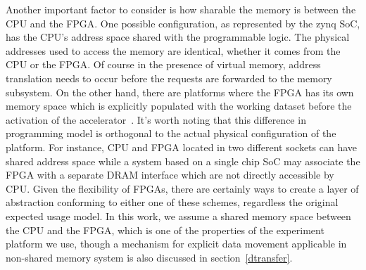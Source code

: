 Another important factor to consider is how sharable the memory
is between the CPU and the FPGA. 
One possible configuration, as represented by the zynq SoC, has
the CPU's address space shared with the programmable logic.
The physical addresses used to access the memory are identical,
whether it comes from the CPU or the FPGA. Of course in the presence
of virtual memory, address translation needs to occur
before the requests are forwarded to the memory subsystem. On the other hand, there are
platforms where the FPGA has its own memory space which is
explicitly populated with the working dataset before the activation of 
the accelerator~\cite{sdaccel}. It's worth noting that this difference in programming model
is orthogonal to the actual physical configuration of the platform. For instance, CPU and FPGA located in two different sockets can have shared address space while a system based on a single chip SoC may associate the FPGA with a separate DRAM interface which are not directly
accessible by CPU. 
Given the flexibility of FPGAs, there are certainly ways to create a layer of abstraction conforming to either one of these schemes, regardless
the original expected usage model. 
In this work, we assume a shared memory space between the CPU and the FPGA, which
is one of the properties of the experiment platform we use, though a mechanism for explicit data movement applicable in non-shared memory system is also discussed in section~\ref{dtransfer}.












